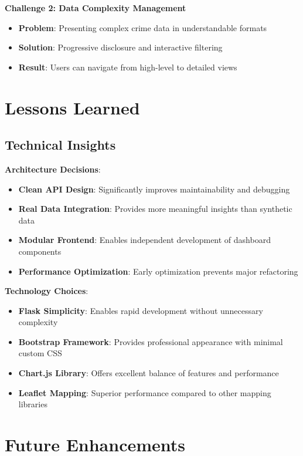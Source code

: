\documentclass[12pt,a4paper]{article}
\begin{document}
\textbf{Challenge 2: Data Complexity Management}
\begin{itemize}
    \item \textbf{Problem}: Presenting complex crime data in understandable formats
    \item \textbf{Solution}: Progressive disclosure and interactive filtering
    \item \textbf{Result}: Users can navigate from high-level to detailed views
\end{itemize}

\section{Lessons Learned}

\subsection{Technical Insights}

\textbf{Architecture Decisions}:
\begin{itemize}
    \item \textbf{Clean API Design}: Significantly improves maintainability and debugging
    \item \textbf{Real Data Integration}: Provides more meaningful insights than synthetic data
    \item \textbf{Modular Frontend}: Enables independent development of dashboard components
    \item \textbf{Performance Optimization}: Early optimization prevents major refactoring
\end{itemize}

\textbf{Technology Choices}:
\begin{itemize}
    \item \textbf{Flask Simplicity}: Enables rapid development without unnecessary complexity
    \item \textbf{Bootstrap Framework}: Provides professional appearance with minimal custom CSS
    \item \textbf{Chart.js Library}: Offers excellent balance of features and performance
    \item \textbf{Leaflet Mapping}: Superior performance compared to other mapping libraries
\end{itemize}



\section{Future Enhancements}
\end{document}
